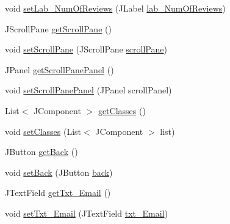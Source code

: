 \begin{DoxyCompactItemize}
\item 
void \mbox{\hyperlink{classcom_1_1_b_n_u_1_1pages_1_1classes_by_teacher_1_1_class_by_teacher_model_a79692eaab0c962f9ab9350270f0b491c}{set\+Lab\+\_\+\+Num\+Of\+Reviews}} (J\+Label \mbox{\hyperlink{classcom_1_1_b_n_u_1_1pages_1_1classes_by_teacher_1_1_class_by_teacher_model_a63049c01b6ca440edacca4fd751bba0a}{lab\+\_\+\+Num\+Of\+Reviews}})
\item 
J\+Scroll\+Pane \mbox{\hyperlink{classcom_1_1_b_n_u_1_1pages_1_1classes_by_teacher_1_1_class_by_teacher_model_ad10f7186f88ceb751d22519845ea60c6}{get\+Scroll\+Pane}} ()
\item 
void \mbox{\hyperlink{classcom_1_1_b_n_u_1_1pages_1_1classes_by_teacher_1_1_class_by_teacher_model_a2286f962d98f9e186e92af0042d50f84}{set\+Scroll\+Pane}} (J\+Scroll\+Pane \mbox{\hyperlink{classcom_1_1_b_n_u_1_1pages_1_1classes_by_teacher_1_1_class_by_teacher_model_a4a33ed46a024cdc731c3e44419ed5d97}{scroll\+Pane}})
\item 
J\+Panel \mbox{\hyperlink{classcom_1_1_b_n_u_1_1pages_1_1classes_by_teacher_1_1_class_by_teacher_model_adf410a63aa301af6b749fa4b9c42608a}{get\+Scroll\+Pane\+Panel}} ()
\item 
void \mbox{\hyperlink{classcom_1_1_b_n_u_1_1pages_1_1classes_by_teacher_1_1_class_by_teacher_model_a248b8cd07e5a864b49fb05a370633dd0}{set\+Scroll\+Pane\+Panel}} (J\+Panel scroll\+Panel)
\item 
List$<$ J\+Component $>$ \mbox{\hyperlink{classcom_1_1_b_n_u_1_1pages_1_1classes_by_teacher_1_1_class_by_teacher_model_a5ac3f5d156c7df7d3db1dbbc29c8e596}{get\+Classes}} ()
\item 
void \mbox{\hyperlink{classcom_1_1_b_n_u_1_1pages_1_1classes_by_teacher_1_1_class_by_teacher_model_a08611270f4b975401d5c476778f369ea}{set\+Classes}} (List$<$ J\+Component $>$ list)
\item 
J\+Button \mbox{\hyperlink{classcom_1_1_b_n_u_1_1pages_1_1classes_by_teacher_1_1_class_by_teacher_model_aa637bd5b69bb7c245eb32107aa8683ab}{get\+Back}} ()
\item 
void \mbox{\hyperlink{classcom_1_1_b_n_u_1_1pages_1_1classes_by_teacher_1_1_class_by_teacher_model_a84002b0aa2fecab53d1106ad5435c98d}{set\+Back}} (J\+Button \mbox{\hyperlink{classcom_1_1_b_n_u_1_1pages_1_1classes_by_teacher_1_1_class_by_teacher_model_ade100a669f1d7119104eb5eae7e55b80}{back}})
\item 
J\+Text\+Field \mbox{\hyperlink{classcom_1_1_b_n_u_1_1pages_1_1classes_by_teacher_1_1_class_by_teacher_model_a2cfc73deb684b19f5859fddb3a5afcbd}{get\+Txt\+\_\+\+Email}} ()
\item 
void \mbox{\hyperlink{classcom_1_1_b_n_u_1_1pages_1_1classes_by_teacher_1_1_class_by_teacher_model_a9e61e94578c84827442b2317ee361acf}{set\+Txt\+\_\+\+Email}} (J\+Text\+Field \mbox{\hyperlink{classcom_1_1_b_n_u_1_1pages_1_1classes_by_teacher_1_1_class_by_teacher_model_ad17ea527f82abedcab1d224bfa61195f}{txt\+\_\+\+Email}})
\end{DoxyCompactItemize}
